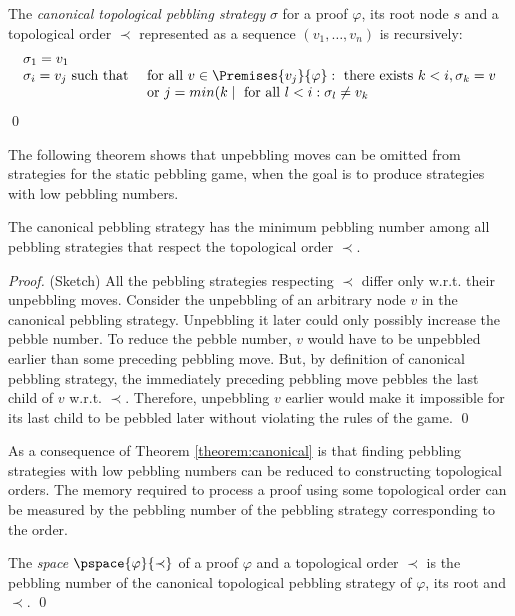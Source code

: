 \begin{definition}
The \emph{canonical topological pebbling strategy} $\sigma$ for a proof $\varphi$, its root node $s$ and a topological order $\prec$ represented as a sequence $(v_1,\dots,v_n)$ is recursively:
$$
\begin{array}{ll}
\sigma_1 = v_1 & \\
\sigma_i = v_j\text{ such that } & \text{for all }v \in \Premises{v_j}{\varphi}:\text{ there exists }k < i, \sigma_k = v \\
                                 & \text{or } j = min(k \mid \text{ for all }l < i: \sigma_l \neq v_k
\end{array}
$$
\qed
\end{definition}

The following theorem shows that unpebbling moves can be omitted from strategies for the static pebbling game, when the goal is to produce strategies with low pebbling numbers.

\begin{theorem}
\label{theorem:canonical}
The canonical pebbling strategy has the minimum pebbling number among all pebbling strategies that respect the topological order $\prec$.
\end{theorem}
\begin{proof} (Sketch)
All the pebbling strategies respecting $\prec$ differ only w.r.t. their unpebbling moves.
Consider the unpebbling of an arbitrary node $v$ in the canonical pebbling strategy. Unpebbling it later could only possibly increase the pebble number. To reduce the pebble number, $v$ would have to be unpebbled earlier than some preceding pebbling move. But, by definition of canonical pebbling strategy, the immediately preceding pebbling move pebbles the last child of $v$ w.r.t. $\prec$. Therefore, unpebbling $v$ earlier would make it impossible for its last child to be pebbled later without violating the rules of the game.
\qed
\end{proof}

As a consequence of Theorem \ref{theorem:canonical} is that finding pebbling strategies with low pebbling numbers can be reduced to constructing topological orders.
The memory required to process a proof using some topological order can be measured by the pebbling number of the pebbling strategy corresponding to the order.

\begin{definition}[Space]
\label{def:space measure}
The \emph{space} $\pspace{\varphi}{\prec}$ 
of a proof $\varphi$ and a topological order $\prec$ is the pebbling number of the canonical topological pebbling strategy of $\varphi$, its root and $\prec$.
\qed
\end{definition}

